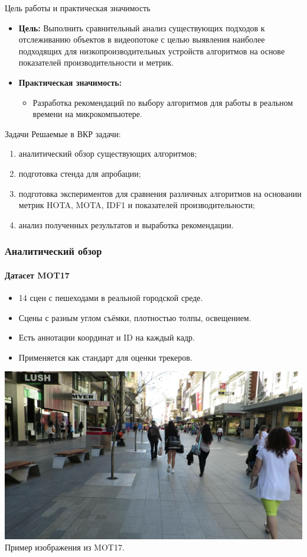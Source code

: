 \documentclass{beamer} %
\begin{document}
\begin{frame}{Цель работы и практическая значимость}
  \begin{itemize}
    \item \textbf{Цель:} Выполнить сравнительный анализ существующих подходов к отслеживанию объектов в
    видеопотоке с целью выявления наиболее подходящих для низкопроизводительных
    устройств алгоритмов на основе показателей производительности и метрик.
    \item \textbf{Практическая значимость:}
      \begin{itemize}
        \item Разработка рекомендаций по выбору алгоритмов для работы в реальном времени на микрокомпьютере.
      \end{itemize}
  \end{itemize}
\end{frame}

\begin{frame}{Задачи}
  Решаемые в ВКР задачи:
  \begin{enumerate}
    \item аналитический обзор существующих алгоритмов;
    \item подготовка стенда для апробации;
    \item подготовка экспериментов для сравнения различных алгоритмов на основании метрик HOTA, MOTA, IDF1 и показателей производительности;
    \item анализ полученных результатов и выработка рекомендации.
\end{enumerate}
\end{frame}

\begin{frame}
  \frametitle{Аналитический обзор}
  \framesubtitle{Датасет MOT17}
  \begin{itemize}
    \item 14 сцен с пешеходами в реальной городской среде.
    \item Сцены с разным углом съёмки, плотностью толпы, освещением.
    \item Есть аннотации координат и ID на каждый кадр.
    \item Применяется как стандарт для оценки трекеров.
  \end{itemize}
  \centering
  \includegraphics[width=0.7\linewidth]{images/review/MOT17_1.jpg}\\
  \small Пример изображения из MOT17.
\end{frame}
\end{document}
